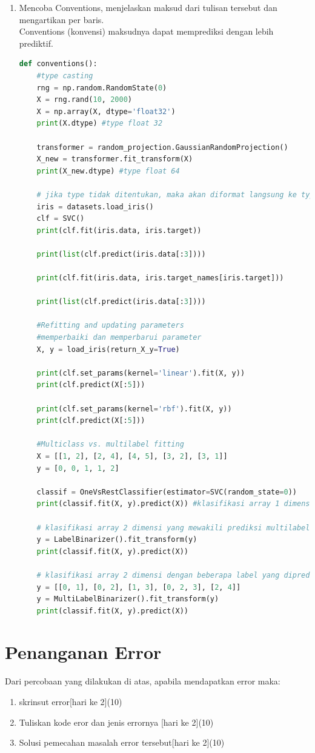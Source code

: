 \begin{enumerate}
\item 
Mencoba Conventions, menjelaskan maksud dari tulisan tersebut dan mengartikan per baris.\\

Conventions (konvensi) maksudnya dapat memprediksi dengan lebih prediktif.\\

\begin{lstlisting}[language=Python]
def conventions():
    #type casting
    rng = np.random.RandomState(0)
    X = rng.rand(10, 2000)
    X = np.array(X, dtype='float32')
    print(X.dtype) #type float 32

    transformer = random_projection.GaussianRandomProjection()
    X_new = transformer.fit_transform(X)
    print(X_new.dtype) #type float 64

    # jika type tidak ditentukan, maka akan diformat langsung ke type float 64
    iris = datasets.load_iris()
    clf = SVC()
    print(clf.fit(iris.data, iris.target))

    print(list(clf.predict(iris.data[:3])))

    print(clf.fit(iris.data, iris.target_names[iris.target]))

    print(list(clf.predict(iris.data[:3])))

    #Refitting and updating parameters
    #memperbaiki dan memperbarui parameter
    X, y = load_iris(return_X_y=True)

    print(clf.set_params(kernel='linear').fit(X, y))
    print(clf.predict(X[:5]))

    print(clf.set_params(kernel='rbf').fit(X, y))
    print(clf.predict(X[:5]))

    #Multiclass vs. multilabel fitting
    X = [[1, 2], [2, 4], [4, 5], [3, 2], [3, 1]]
    y = [0, 0, 1, 1, 2]

    classif = OneVsRestClassifier(estimator=SVC(random_state=0))
    print(classif.fit(X, y).predict(X)) #klasifikasi array 1 dimensi

    # klasifikasi array 2 dimensi yang mewakili prediksi multilabel
    y = LabelBinarizer().fit_transform(y)
    print(classif.fit(X, y).predict(X))

    # klasifikasi array 2 dimensi dengan beberapa label yang diprediksi untuk setiap instans.
    y = [[0, 1], [0, 2], [1, 3], [0, 2, 3], [2, 4]]
    y = MultiLabelBinarizer().fit_transform(y)
    print(classif.fit(X, y).predict(X))
\end{lstlisting}

\end{enumerate}


\section{Penanganan Error}
Dari percobaan yang dilakukan di atas, apabila mendapatkan error maka:

\begin{enumerate}
	\item
	skrinsut error[hari ke 2](10)
	\item
Tuliskan kode eror dan jenis errornya [hari ke 2](10)
	\item
Solusi pemecahan masalah error tersebut[hari ke 2](10)

\end{enumerate}

